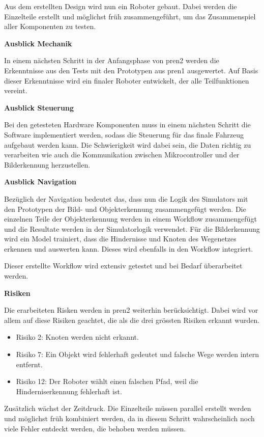 Aus dem erstellten Design wird nun ein Roboter gebaut. Dabei werden die Einzelteile erstellt und möglichst früh zusammengeführt, um das Zusammenspiel aller Komponenten zu testen.

\textbf{Ausblick Mechanik}

In einem nächsten Schritt in der Anfangsphase von \acrshort{pren2} werden die Erkenntnisse aus den Tests mit den Prototypen aus \acrshort{pren1} ausgewertet. Auf Basis dieser Erkenntnisse wird ein finaler Roboter entwickelt, der alle Teilfunktionen vereint.   

\textbf{Ausblick Steuerung}

Bei den getesteten Hardware Komponenten  muss in einem nächsten Schritt die Software implementiert werden, sodass die Steuerung für das finale Fahrzeug aufgebaut werden kann. Die Schwierigkeit wird dabei sein, die Daten richtig zu verarbeiten wie auch die Kommunikation zwischen Mikrocontroller und der Bilderkennung herzustellen.

\textbf{Ausblick Navigation}

Bezüglich der Navigation bedeutet das, dass nun die Logik des Simulators mit den Prototypen der Bild- und Objekterkennung zusammengefügt werden. Die einzelnen Teile der Objekterkennung werden in einem Workflow zusammengefügt und die Resultate werden in der Simulatorlogik verwendet. Für die Bilderkennung wird ein Model trainiert, dass die Hindernisse und Knoten des Wegenetzes erkennen und auswerten kann. Dieses wird ebenfalls in den Workflow integriert.

Dieser erstellte Workflow wird extensiv getestet und bei Bedarf überarbeitet werden.

\textbf{Risiken}

Die erarbeiteten Risken werden in \acrshort{pren2} weiterhin berücksichtigt. Dabei wird vor allem auf diese Risiken geachtet, die als die drei grössten Risiken erkannt wurden.

\begin{itemize}
    \item Risiko 2: Knoten werden nicht erkannt.
    \item Risiko 7: Ein Objekt wird fehlerhaft gedeutet und falsche Wege werden intern entfernt.
    \item Risiko 12: Der Roboter wählt einen falschen Pfad, weil die Hinderniserkennung fehlerhaft ist.
\end{itemize}

Zusätzlich wächst der Zeitdruck. Die Einzelteile müssen parallel erstellt werden und möglichst früh kombiniert werden, da in diesem Schritt wahrscheinlich noch viele Fehler entdeckt werden, die behoben werden müssen. 

